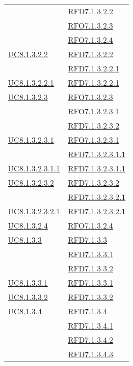 \begin{longtable}{|>{\centering}m{5cm}|m{5cm}<{\centering}|}
& \hyperlink{RFD7.1.3.2.2}{RFD7.1.3.2.2}\\
& \hyperlink{RFO7.1.3.2.3}{RFO7.1.3.2.3}\\
& \hyperlink{RFO7.1.3.2.4}{RFO7.1.3.2.4}\\ \hline
\hyperref[UC8.1.3.2.2]{UC8.1.3.2.2} & \hyperlink{RFD7.1.3.2.2}{RFD7.1.3.2.2}\\
& \hyperlink{RFD7.1.3.2.2.1}{RFD7.1.3.2.2.1}\\ \hline
\hyperref[UC8.1.3.2.2.1]{UC8.1.3.2.2.1} & \hyperlink{RFD7.1.3.2.2.1}{RFD7.1.3.2.2.1}\\ \hline
\hyperref[UC8.1.3.2.3]{UC8.1.3.2.3} & \hyperlink{RFO7.1.3.2.3}{RFO7.1.3.2.3}\\
& \hyperlink{RFO7.1.3.2.3.1}{RFO7.1.3.2.3.1}\\
& \hyperlink{RFD7.1.3.2.3.2}{RFD7.1.3.2.3.2}\\ \hline
\hyperref[UC8.1.3.2.3.1]{UC8.1.3.2.3.1} & \hyperlink{RFO7.1.3.2.3.1}{RFO7.1.3.2.3.1}\\
& \hyperlink{RFD7.1.3.2.3.1.1}{RFD7.1.3.2.3.1.1}\\ \hline
\hyperref[UC8.1.3.2.3.1.1]{UC8.1.3.2.3.1.1} & \hyperlink{RFD7.1.3.2.3.1.1}{RFD7.1.3.2.3.1.1}\\ \hline
\hyperref[UC8.1.3.2.3.2]{UC8.1.3.2.3.2} & \hyperlink{RFD7.1.3.2.3.2}{RFD7.1.3.2.3.2}\\
& \hyperlink{RFD7.1.3.2.3.2.1}{RFD7.1.3.2.3.2.1}\\ \hline
\hyperref[UC8.1.3.2.3.2.1]{UC8.1.3.2.3.2.1} & \hyperlink{RFD7.1.3.2.3.2.1}{RFD7.1.3.2.3.2.1}\\ \hline
\hyperref[UC8.1.3.2.4]{UC8.1.3.2.4} & \hyperlink{RFO7.1.3.2.4}{RFO7.1.3.2.4}\\ \hline
\hyperref[UC8.1.3.3]{UC8.1.3.3} & \hyperlink{RFD7.1.3.3}{RFD7.1.3.3}\\
& \hyperlink{RFD7.1.3.3.1}{RFD7.1.3.3.1}\\
& \hyperlink{RFD7.1.3.3.2}{RFD7.1.3.3.2}\\ \hline
\hyperref[UC8.1.3.3.1]{UC8.1.3.3.1} & \hyperlink{RFD7.1.3.3.1}{RFD7.1.3.3.1}\\ \hline
\hyperref[UC8.1.3.3.2]{UC8.1.3.3.2} & \hyperlink{RFD7.1.3.3.2}{RFD7.1.3.3.2}\\ \hline
\hyperref[UC8.1.3.4]{UC8.1.3.4} & \hyperlink{RFD7.1.3.4}{RFD7.1.3.4}\\
& \hyperlink{RFD7.1.3.4.1}{RFD7.1.3.4.1}\\
& \hyperlink{RFD7.1.3.4.2}{RFD7.1.3.4.2}\\
& \hyperlink{RFD7.1.3.4.3}{RFD7.1.3.4.3}\\

\end{longtable}
